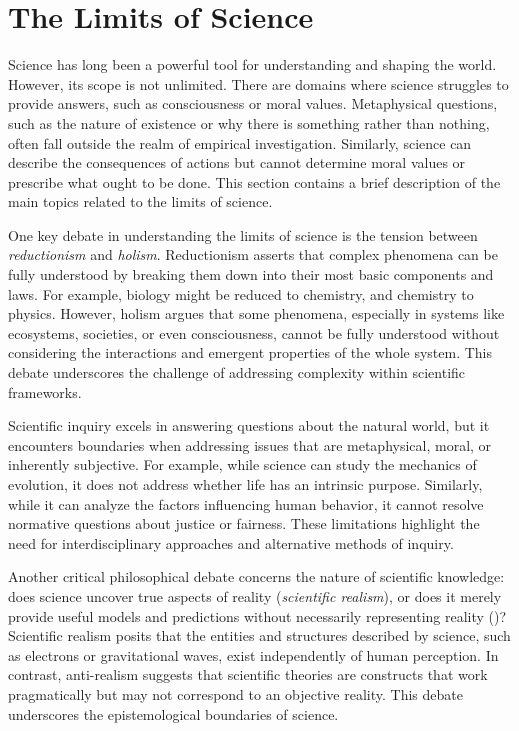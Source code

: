 %
% 

\section{The Limits of Science}

Science has long been a powerful tool for understanding and shaping the world. However, its scope is not unlimited. There are domains where science struggles to provide answers, such as consciousness or moral values. Metaphysical questions, such as the nature of existence or why there is something rather than nothing, often fall outside the realm of empirical investigation. Similarly, science can describe the consequences of actions but cannot determine moral values or prescribe what ought to be done. This section contains a brief description of the main topics related to the limits of science.

One key debate in understanding the limits of science is the tension between \emph{reductionism} and \emph{holism}. Reductionism asserts that complex phenomena can be fully understood by breaking them down into their most basic components and laws. For example, biology might be reduced to chemistry, and chemistry to physics. However, holism argues that some phenomena, especially in systems like ecosystems, societies, or even consciousness, cannot be fully understood without considering the interactions and emergent properties of the whole system. This debate underscores the challenge of addressing complexity within scientific frameworks.

Scientific inquiry excels in answering questions about the natural world, but it encounters boundaries when addressing issues that are metaphysical, moral, or inherently subjective. For example, while science can study the mechanics of evolution, it does not address whether life has an intrinsic purpose. Similarly, while it can analyze the factors influencing human behavior, it cannot resolve normative questions about justice or fairness. These limitations highlight the need for interdisciplinary approaches and alternative methods of inquiry.

Another critical philosophical debate concerns the nature of scientific knowledge: does science uncover true aspects of reality (\emph{scientific realism}), or does it merely provide useful models and predictions without necessarily representing reality ()? Scientific realism posits that the entities and structures described by science, such as electrons or gravitational waves, exist independently of human perception. In contrast, anti-realism suggests that scientific theories are constructs that work pragmatically but may not correspond to an objective reality. This debate underscores the epistemological boundaries of science.

